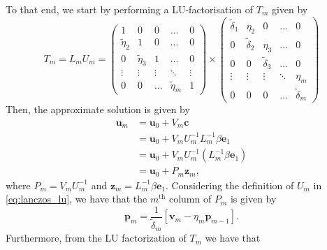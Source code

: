 To that end, we start by performing a LU-factorisation of $T_m$ given by
\begin{equation}
  T_m = L_m U_m =
  \begin{pmatrix}
    1              & 0              & 0      & \dots          & 0      \\
    \tilde{\eta}_2 & 1              & 0      & \dots          & 0      \\
    0              & \tilde{\eta}_3 & 1      & \dots          & 0      \\
    \vdots         & \vdots         & \vdots & \ddots         & \vdots \\
    0              & 0              & \dots  & \tilde{\eta}_m & 1
  \end{pmatrix}
  \times
  \begin{pmatrix}
    \tilde{\delta}_1 & \eta_2           & 0                & \dots  & 0                \\
    0                & \tilde{\delta}_2 & \eta_3           & \dots  & 0                \\
    0                & 0                & \tilde{\delta}_3 & \dots  & 0                \\
    \vdots           & \vdots           & \vdots           & \ddots & \eta_m           \\
    0                & 0                & 0                & \dots  & \tilde{\delta}_m
  \end{pmatrix}
  \label{eq:lanczos_lu}
\end{equation}
Then, the approximate solution is given by
\begin{align*}
  \mathbf{u}_m & = \mathbf{u}_0 + V_m \mathbf{c}                           \\
      & = \mathbf{u}_0 + V_m U_m^{-1} L_m^{-1} \beta \mathbf{e}_1   \\
      & = \mathbf{u}_0 + V_m U_m^{-1} (L_m^{-1} \beta \mathbf{e}_1) \\
      & = \mathbf{u}_0 + P_m \mathbf{z}_m,
\end{align*}
where $P_m = V_m U_m^{-1}$ and $\mathbf{z}_m = L_m^{-1} \beta \mathbf{e}_1$. Considering the definition of $U_m$ in \cref{eq:lanczos_lu}, we have that the $m^{\text{th}}$ column of $P_m$ is given by
\begin{equation}
  \mathbf{p}_m = \frac{1}{\tilde{\delta}_m}\left[\mathbf{v}_m - \eta_m \mathbf{p}_{m-1}\right].
  \label{eq:lanczos_p}
\end{equation}
Furthermore, from the LU factorization of $T_m$ we have that
